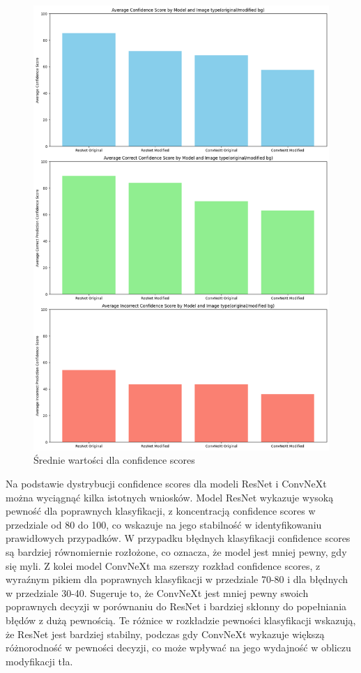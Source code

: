 \begin{figure}
	\centering\includegraphics[width=.9\textwidth]{img/confidence_avg}
	\caption{Średnie wartości dla confidence scores}  
    \label{rys:confidence_avg}
\end{figure}
\newpage
Na podstawie dystrybucji confidence scores dla modeli ResNet i ConvNeXt można wyciągnąć kilka istotnych wniosków. Model ResNet wykazuje wysoką 
pewność dla poprawnych klasyfikacji, z koncentracją confidence scores w przedziale od 80 do 100, co wskazuje na jego stabilność w 
identyfikowaniu prawidłowych przypadków. W przypadku błędnych klasyfikacji confidence scores są bardziej równomiernie rozłożone, co oznacza, 
że model jest mniej pewny, gdy się myli. Z kolei model ConvNeXt ma szerszy rozkład confidence scores, z wyraźnym pikiem dla poprawnych 
klasyfikacji w przedziale 70-80 i dla błędnych w przedziale 30-40. Sugeruje to, że ConvNeXt jest mniej pewny swoich poprawnych decyzji w 
porównaniu do ResNet i bardziej skłonny do popełniania błędów z dużą pewnością. Te różnice w rozkładzie pewności klasyfikacji wskazują, że 
ResNet jest bardziej stabilny, podczas gdy ConvNeXt wykazuje większą różnorodność w pewności decyzji, co może wpływać na jego wydajność w 
obliczu modyfikacji tła.


